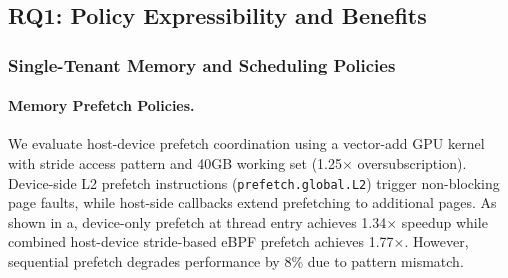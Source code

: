 \subsection{RQ1: Policy Expressibility and Benefits}
\label{sec:rq1}

\subsubsection{Single-Tenant Memory and Scheduling Policies}
\label{sec:rq1-micro}

\paragraph{Memory Prefetch Policies.}
We evaluate host-device prefetch coordination using a vector-add GPU kernel~\cite{nvidia_cuda_samples} with stride access pattern and 40GB working set (1.25$\times$ oversubscription).
Device-side L2 prefetch instructions (\texttt{prefetch.\allowbreak{}global.\allowbreak{}L2}) trigger non-blocking page faults, while host-side callbacks extend prefetching to additional pages.
As shown in a, device-only prefetch at thread entry achieves 1.34$\times$ speedup while combined host-device stride-based eBPF prefetch achieves 1.77$\times$.
However, sequential prefetch degrades performance by 8\% due to pattern mismatch.

